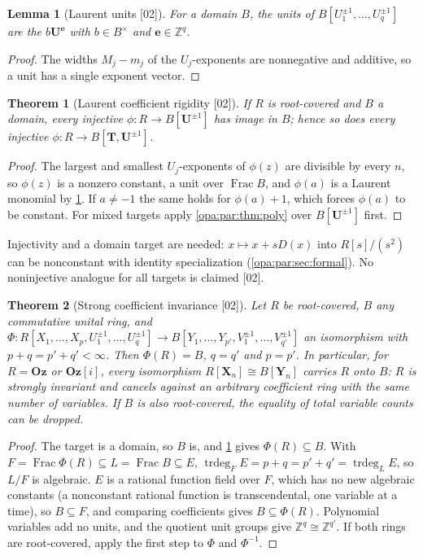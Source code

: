 \documentclass[11pt,oneside]{article}
\numberwithin{equation}{section}
\newtheorem{theorem}{Theorem}[section]
\newtheorem{lemma}[lemma]{Lemma}
\theoremstyle{definition}
\theoremstyle{remark}
\newcommand{\Oz}{\mathbf{Oz}}
\newcommand{\Og}{\mathbf{Oz}[i]}
\newcommand{\Z}{\mathbb Z}
\newcommand{\Frac}{\operatorname{Frac}}
\newcommand{\trdeg}{\operatorname{trdeg}}
\newcommand{\src}[1]{\textup{\textsf{\small[#1]}}}
\begin{document}
\begin{lemma}[Laurent units \src{02}]\label{opa:par:lem:laurentunits}
For a domain $B$, the units of $B[U_1^{\pm1},\dots,U_q^{\pm1}]$ are the
$b\mathbf U^{\mathbf e}$ with $b\in B^\times$ and $\mathbf e\in\Z^q$.
\end{lemma}
\begin{proof}
The widths $M_j-m_j$ of the $U_j$-exponents are nonnegative and additive, so a unit
has a single exponent vector.
\end{proof}

\begin{theorem}[Laurent coefficient rigidity \src{02}]\label{opa:par:thm:laurent}
If $R$ is root-covered and $B$ a domain, every injective
$\phi:R\to B[\mathbf U^{\pm1}]$ has image in $B$; hence so does every injective
$\phi:R\to B[\mathbf T,\mathbf U^{\pm1}]$.
\end{theorem}
\begin{proof}
The largest and smallest $U_j$-exponents of $\phi(z)$ are divisible by every $n$, so
$\phi(z)$ is a nonzero constant, a unit over $\Frac B$, and $\phi(a)$ is a Laurent
monomial by \cref{opa:par:lem:laurentunits}. If $a\ne-1$ the same holds for $\phi(a)+1$,
which forces $\phi(a)$ to be constant. For mixed targets apply
\cref{opa:par:thm:poly} over $B[\mathbf U^{\pm1}]$ first.
\end{proof}

Injectivity and a domain target are needed: $x\mapsto x+sD(x)$ into $R[s]/(s^2)$ can
be nonconstant with identity specialization (\cref{opa:par:sec:formal}). No
noninjective analogue for all targets is claimed \src{02}.

\begin{theorem}[Strong coefficient invariance \src{02}]\label{opa:par:thm:cancellation}
Let $R$ be root-covered, $B$ any commutative unital ring, and
$\Phi:R[X_1,\dots,X_p,U_1^{\pm1},\dots,U_q^{\pm1}]\to
B[Y_1,\dots,Y_{p'},V_1^{\pm1},\dots,V_{q'}^{\pm1}]$ an isomorphism with
$p+q=p'+q'<\infty$. Then $\Phi(R)=B$, $q=q'$ and $p=p'$. In particular, for
$R=\Oz$ or $\Og$, every isomorphism $R[\mathbf X_n]\cong B[\mathbf Y_n]$ carries $R$
onto $B$: $R$ is strongly invariant and cancels against an arbitrary coefficient
ring with the same number of variables. If $B$ is also root-covered, the equality of
total variable counts can be dropped.
\end{theorem}
\begin{proof}
The target is a domain, so $B$ is, and \cref{opa:par:thm:laurent} gives
$\Phi(R)\subseteq B$. With $F=\Frac\Phi(R)\subseteq L=\Frac B\subseteq E$,
$\trdeg_FE=p+q=p'+q'=\trdeg_LE$, so $L/F$ is algebraic. $E$ is a rational function
field over $F$, which has no new algebraic constants (a nonconstant rational function
is transcendental, one variable at a time), so $B\subseteq F$, and comparing coefficients
gives $B\subseteq\Phi(R)$. Polynomial variables add no units, and the quotient unit
groups give $\Z^q\cong\Z^{q'}$. If both rings are root-covered, apply the first step
to $\Phi$ and $\Phi^{-1}$.
\end{proof}
\end{document}
